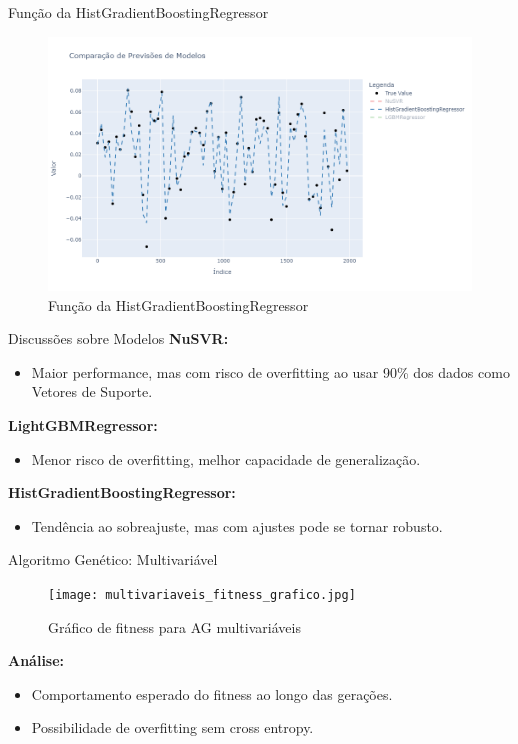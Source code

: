 \documentclass{beamer}
\begin{document}
\begin{frame}{Função da HistGradientBoostingRegressor}
    \begin{figure}[H]
        \centering
        \includegraphics[width=1\linewidth]{HistGradientBoostingRegressor.png}
        \caption{Função da HistGradientBoostingRegressor}
    \end{figure}
\end{frame}

\begin{frame}{Discussões sobre Modelos}
    \textbf{NuSVR:}
    \begin{itemize}
        \item Maior performance, mas com risco de overfitting ao usar 90\% dos dados como Vetores de Suporte.
    \end{itemize}
    \textbf{LightGBMRegressor:}
    \begin{itemize}
        \item Menor risco de overfitting, melhor capacidade de generalização.
    \end{itemize}
    \textbf{HistGradientBoostingRegressor:}
    \begin{itemize}
        \item Tendência ao sobreajuste, mas com ajustes pode se tornar robusto.
    \end{itemize}
\end{frame}

\begin{frame}{Algoritmo Genético: Multivariável}
    \begin{figure}[H]
        \centering
        \texttt{[image: multivariaveis\_fitness\_grafico.jpg]}
        \caption{Gráfico de fitness para AG multivariáveis}
    \end{figure}
    \textbf{Análise:}
    \begin{itemize}
        \item Comportamento esperado do fitness ao longo das gerações.
        \item Possibilidade de overfitting sem cross entropy.
    \end{itemize}
\end{frame}
\end{document}
